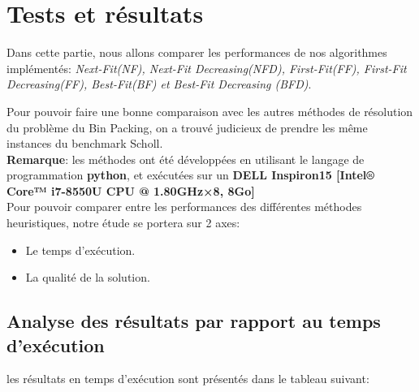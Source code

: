 \documentclass[class=article, crop=false]{standalone}
\begin{document}
\section{Tests et résultats}
Dans cette partie, nous allons comparer les performances de nos algorithmes implémentés:
\emph{Next-Fit(NF), Next-Fit Decreasing(NFD), First-Fit(FF), First-Fit Decreasing(\emph{FF}), Best-Fit(BF) et Best-Fit Decreasing (BFD)}. 

Pour pouvoir faire une bonne comparaison avec les autres méthodes de résolution du problème du Bin Packing,
on a trouvé judicieux de prendre les même instances du benchmark Scholl. \\

\textbf{Remarque}: les méthodes ont été développées en utilisant le langage de programmation \textbf{python}, et exécutées sur un \textbf{DELL Inspiron15 [Intel® Core™ i7-8550U CPU @ 1.80GHz×8, 8Go]}\\

Pour pouvoir comparer entre les performances des différentes méthodes heuristiques, notre étude se portera sur 2 axes:
\begin{itemize}
    \item Le temps d’exécution.
    \item La qualité de la solution.
\end{itemize}

\subsection{Analyse des résultats par rapport au temps d’exécution}
les résultats en temps d'exécution sont présentés dans le tableau suivant:  
\end{document}

